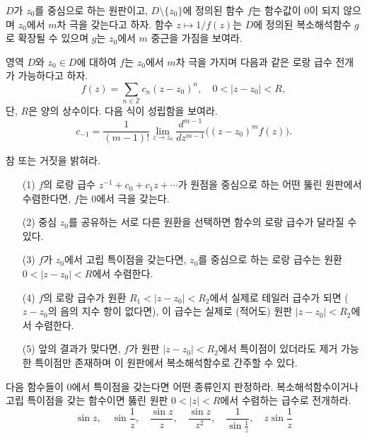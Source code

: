 \begin{salt_exercise}\label{ex-4-31}
$D$가 $z_0$를 중심으로 하는 원판이고, 
$D\setminus \{z_0\}$에 정의된 함수 $f$는 함수값이 $0$이 되지 않으며
$z_0$에서 $m$차 극을 갖는다고 하자. 
함수 $z\mapsto 1/f(z)$는 $D$에 정의된 복소해석함수 $g$로 확장될 수 있으며
$g$는 $z_0$에서 $m$ 중근을 가짐을 보여라.
\end{salt_exercise}

\begin{salt_exercise}\label{ex-4-32}
영역 $D$와  $z_0\in D$에 대하여
$f$는 $z_0$에서 $m$차 극을 가지며 다음과 같은 로랑 급수 전개가 가능하다고 하자.
\[
f(z) = \sum_{n\in\mathbb Z} c_n(z-z_0)^n,\quad
0<|z-z_0|<R,
\]
단, $R$은 양의 상수이다. 다음 식이 성립함을 보여라.
\[
c_{-1} = \dfrac1{(m-1)!}\lim_{z\to z_0} \dfrac{d^{m-1}}{dz^{m-1}}
\Big( (z-z_0)^m f(z) \Big).
\]
\end{salt_exercise}

\begin{salt_exercise}\label{ex-4-33}
참 또는 거짓을 밝혀라.
\begin{itemize}
\item[(1)] $f$의 로랑 급수 $z^{-1} + c_0 + c_1z + \cdots$가
원점을 중심으로 하는 어떤 뚫린 원판에서 수렴한다면, $f$는 $0$에서 극을 갖는다.
\item[(2)] 중심 $z_0$를 공유하는 서로 다른 원환을 선택하면 함수의 
로랑 급수가 달라질 수 있다.
\item[(3)] $f$가 $z_0$에서 고립 특이점을 갖는다면, 
$z_0$를 중심으로 하는 로랑 급수는 원환 $0<|z-z_0|<R$에서 수렴한다.
\item[(4)] $f$의 로랑 급수가 원환 $R_1 <|z-z_0| <R_2$에서
실제로 테일러 급수가 되면 ($z-z_0$의 음의 지수 항이 없다면),
이 급수는 실제로 (적어도) 원판 $|z-z_0|<R_2$에서 수렴한다.
\item[(5)] 앞의 결과가 맞다면, $f$가 원판 $|z-z_0|<R_2$에서
특이점이 있더라도 제거 가능한 특이점만 존재하며 
이 원판에서 복소해석함수로 간주할 수 있다.
\end{itemize}
\end{salt_exercise}

\begin{salt_exercise}\label{ex-4-34}
다음 함수들이 $0$에서 특이점을 갖는다면 어떤 종류인지 판정하라.
복소해석함수이거나 고립 특이점을 갖는 함수이면
뚫린 원판 $0<|z|<R$에서 수렴하는 급수로 전개하라.
\[
\sin z, \quad \sin \dfrac1z,\quad \dfrac{\sin z}z,
\quad \dfrac{\sin z}{z^2}, \quad \dfrac1{\sin \frac1z},
\quad z\sin \dfrac1z
\]
\end{salt_exercise}

